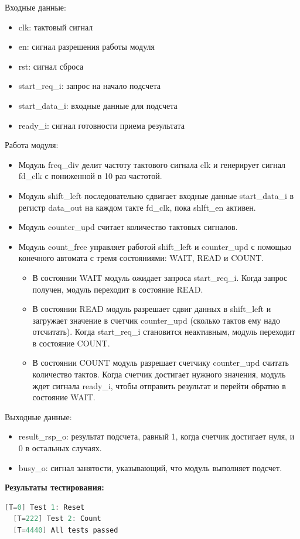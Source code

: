\documentclass[12pt,onecolumn]{article}
\begin{document}
Входные данные:
\begin{itemize}
    \item clk: тактовый сигнал
    \item en: сигнал разрешения работы модуля
    \item rst: сигнал сброса
    \item start\_req\_i: запрос на начало подсчета
    \item start\_data\_i: входные данные для подсчета
    \item ready\_i: сигнал готовности приема результата
\end{itemize}
Работа модуля:
\begin{itemize}
    \item Модуль freq\_div делит частоту тактового сигнала clk и генерирует сигнал fd\_clk с пониженной в 10 раз частотой.
    \item Модуль shift\_left последовательно сдвигает входные данные start\_data\_i в регистр data\_out на каждом такте fd\_clk, пока shlft\_en активен.
    \item Модуль counter\_upd считает количество тактовых сигналов.
    \item {Модуль count\_free управляет работой shift\_left и counter\_upd с помощью конечного автомата с тремя состояниями: WAIT, READ и COUNT.
    \begin{itemize}
        \item В состоянии WAIT модуль ожидает запроса start\_req\_i. Когда запрос получен, модуль переходит в состояние READ.
        \item В состоянии READ модуль разрешает сдвиг данных в shift\_left и загружает значение в счетчик counter\_upd (сколько тактов ему надо отсчитать). Когда start\_req\_i становится неактивным, модуль переходит в состояние COUNT.
        \item В состоянии COUNT модуль разрешает счетчику counter\_upd считать количество тактов. Когда счетчик достигает нужного значения, модуль ждет сигнала ready\_i, чтобы отправить результат и перейти обратно в состояние WAIT.
\end{itemize}
    }
\end{itemize}
Выходные данные:
\begin{itemize}
    \item result\_rsp\_o: результат подсчета, равный 1, когда счетчик достигает нуля, и 0 в остальных случаях.
    \item busy\_o: сигнал занятости, указывающий, что модуль выполняет подсчет.
\end{itemize}
\textbf{Результаты тестирования:}
\begin{lstlisting}[language=verilog]
  [T=0] Test 1: Reset
  [T=222] Test 2: Count
  [T=4440] All tests passed
\end{lstlisting}
\end{document}
